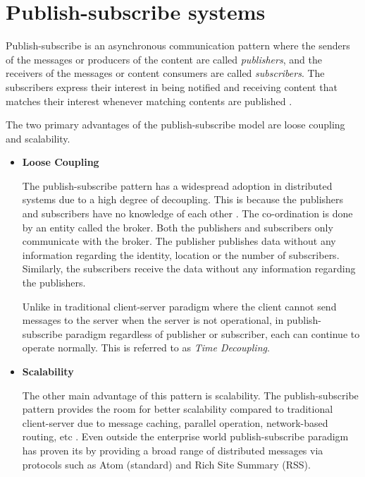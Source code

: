 \section{Publish-subscribe systems}

Publish-subscribe is an asynchronous communication pattern where the senders of the messages or producers of the content are called \textit{publishers}, and the receivers of the messages or content consumers are called \textit {subscribers}. The subscribers express their interest in being notified and receiving content that matches their interest whenever matching contents are published \parencite{Pietzuch:2002:HDE:646854.708058}.

The two primary advantages of the publish-subscribe model are loose coupling and scalability.

\begin{itemize}
\item[]\textbf{Loose Coupling}

The publish-subscribe pattern has a widespread adoption in distributed systems due to a high degree of decoupling. This is because the publishers and subscribers have no knowledge of each other \parencite{Cheung:2010:LBC:1880018.1880020}. The co-ordination is done by an entity called the broker. Both the publishers and subscribers only communicate with the broker. The publisher publishes data without any information regarding the identity, location or the number of subscribers. Similarly, the subscribers receive the data without any information regarding the publishers. 

Unlike in traditional client-server paradigm where the client cannot send messages to the server when the server is not operational, in publish-subscribe paradigm regardless of publisher or subscriber, each can continue to operate normally. This is referred to as \textit {Time Decoupling}.   

\item[]\textbf{Scalability}

The other main advantage of this pattern is scalability. The publish-subscribe pattern provides the room for better scalability compared to traditional client-server due to message caching, parallel operation, network-based routing, etc \parencite{pub_sub_wiki}. Even outside the enterprise world publish-subscribe paradigm has proven its by providing a broad range of distributed messages via protocols such as Atom (standard) and Rich Site Summary (RSS).

\end{itemize}


